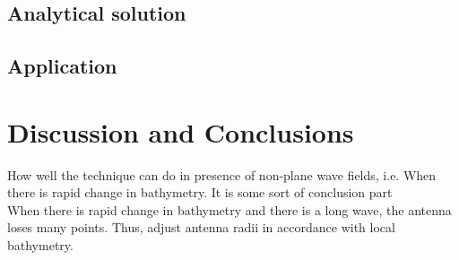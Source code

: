 \subsection{Analytical solution}
\subsection{Application}

\section{Discussion and Conclusions}
How well the technique can do in presence of non-plane wave fields, i.e. When there is rapid change in bathymetry. It is some sort of conclusion part\\
When there is rapid change in bathymetry and there is a long wave, the antenna loses many points. Thus, adjust antenna radii in accordance with local bathymetry.




